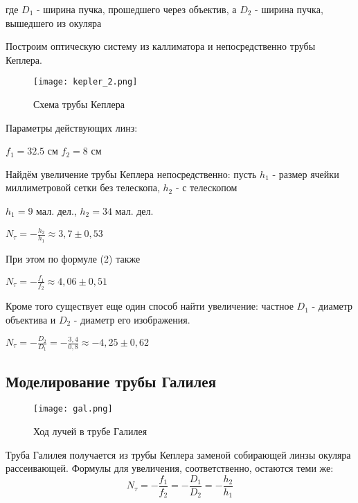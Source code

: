 где $D_1$ - ширина пучка, прошедшего через объектив, а $D_2$ - ширина пучка, вышедшего из окуляра

Построим оптическую систему из каллиматора и непосредственно трубы Кеплера. 

\begin{figure}[h!]
        \centering
            \texttt{[image: kepler\_2.png]}
            \caption{Схема трубы Кеплера}
        \label{}
\end{figure}

Параметры действующих линз:

\begin{center}
    $f_{1} = 32.5$ см \hspace{1cm} $f_2 = 8$ см
\end{center}

Найдём увеличение трубы Кеплера непосредственно: пусть $h_1$ - размер ячейки миллиметровой сетки без телескопа, $h_2$ - с телескопом

\begin{center}
	$h_1 = 9$ мал. дел., \hspace{1cm} $h_2 = 34$ мал. дел. \par

	$N_{\tau} = -\frac{h_2}{h_1} \approx 3,7 \pm 0,53$
\end{center}

При этом по формуле (2) также

\begin{center}
    $N_{\tau} = -\frac{f_{1}}{f_2} \approx 4,06 \pm 0,51$
\end{center}

Кроме того существует еще один способ найти увеличение: частное $D_1 $ - диаметр объектива и $D_2$ - диаметр его изображения.

\begin{center}
	$N_{\tau} = -\frac{D_2}{D_1} = -\frac{3,4}{0,8} \approx -4,25 \pm 0,62$
\end{center}



\subsection{Моделирование трубы Галилея}
    \begin{figure}[h!]
    \centering
    \texttt{[image: gal.png]}
    \caption{Ход лучей в трубе Галилея}
    \label{}
\end{figure}

Труба Галилея получается из трубы Кеплера заменой собирающей линзы окуляра рассеивающей. Формулы для увеличения, соответственно, остаются теми же:
\begin{equation}
    N_{\tau} = -\frac{f_1}{f_2} = -\frac{D_1}{D_2} =  -\frac{h_2}{h_1}
\end{equation}


